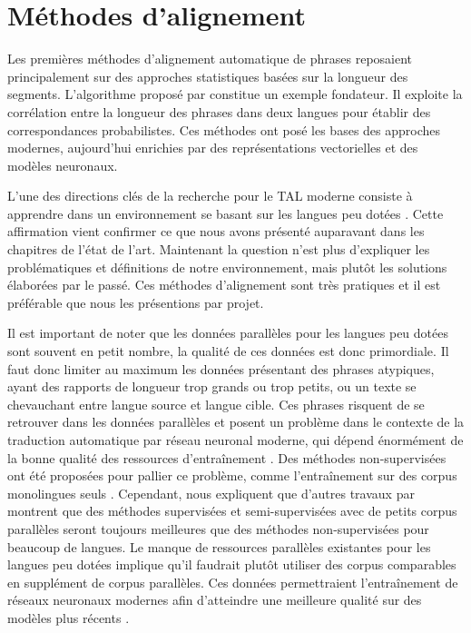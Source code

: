 \chapter{Méthodes d’alignement}

Les premières méthodes d’alignement automatique de phrases reposaient principalement sur
des approches statistiques basées sur la longueur des segments. L’algorithme proposé par
\citet{gale_1991} constitue un exemple fondateur. Il exploite la corrélation entre la
longueur des phrases dans deux langues pour établir des correspondances probabilistes.
Ces méthodes ont posé les bases des approches modernes, aujourd’hui enrichies par des
représentations vectorielles et des modèles neuronaux.

L'une des directions clés de la recherche pour le TAL moderne consiste à apprendre dans un environnement se basant sur les langues peu dotées
\citep{hedderich_2021, artemova_2023}. Cette affirmation vient confirmer ce que nous avons présenté
auparavant dans les chapitres de l'état de l'art. Maintenant la question n'est plus d'expliquer les
problématiques et définitions de notre environnement, mais plutôt les solutions élaborées par le passé.
Ces méthodes d'alignement sont très pratiques et il est préférable que nous les présentions par projet.

Il est important de noter que les données parallèles pour les langues peu dotées sont souvent en petit nombre, la qualité
de ces données est donc primordiale. Il faut donc limiter au maximum les données présentant des phrases atypiques,
ayant des rapports de longueur trop grands ou trop petits, ou un texte se chevauchant entre langue source et langue cible.
Ces phrases risquent de se retrouver dans les données parallèles et posent un problème dans le contexte de la traduction
automatique par réseau neuronal moderne, qui dépend énormément de la bonne qualité des ressources
d'entraînement \citep{tan_2022}. Des méthodes non-supervisées ont été proposées pour pallier ce problème, comme
l'entraînement sur des corpus monolingues seuls \citep{artetxe_2018, lample_2018}. Cependant,
\citet{steingrimsson_2021} nous expliquent que d'autres travaux par \citet{kim_2020} montrent que des méthodes
supervisées et semi-supervisées avec de petits corpus parallèles seront toujours meilleures que des méthodes
non-supervisées pour beaucoup de langues. Le manque de ressources parallèles existantes pour les langues peu
dotées implique qu'il faudrait plutôt utiliser des corpus comparables en supplément de corpus parallèles.
Ces données permettraient l'entraînement de réseaux neuronaux modernes afin d'atteindre une meilleure qualité sur des modèles plus récents
\citep{steingrimsson_2023}.

